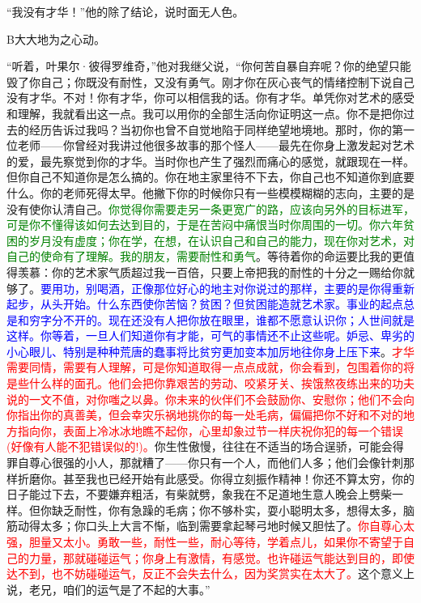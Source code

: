 \documentclass[12pt, UTF8]{ctexbook}
\begin{document}
\par “我没有才华！”他的除了结论，说时面无人色。
\par B大大地为之心动。
\par “听着，叶果尔·彼得罗维奇，”他对我继父说，“你何苦自暴自弃呢？你的绝望只能毁了你自己；你既没有耐性，又没有勇气。刚才你在灰心丧气的情绪控制下说自己没有才华。不对！你有才华，你可以相信我的话。你有才华。单凭你对艺术的感受和理解，我就看出这一点。我可以用你的全部生活向你证明这一点。你不是把你过去的经历告诉过我吗？当初你也曾不自觉地陷于同样绝望地境地。那时，你的第一位老师——你曾经对我讲过他很多故事的那个怪人——最先在你身上激发起对艺术的爱，最先察觉到你的才华。当时你也产生了强烈而痛心的感觉，就跟现在一样。但你自己不知道你是怎么搞的。你在地主家里待不下去，你自己也不知道你到底要什么。你的老师死得太早。他撇下你的时候你只有一些模模糊糊的志向，主要的是没有使你认清自己。\textcolor{green}{你觉得你需要走另一条更宽广的路，应该向另外的目标进军，可是你不懂得该如何去达到目的，于是在苦闷中痛恨当时你周围的一切。你六年贫困的岁月没有虚度；你在学，在想，在认识自己和自己的能力，现在你对艺术，对自己的使命有了理解。我的朋友，需要耐性和勇气}。等待着你的命运要比我的更值得羡慕：你的艺术家气质超过我一百倍，只要上帝把我的耐性的十分之一赐给你就够了。\textcolor{blue}{要用功，别喝酒，正像那位好心的地主对你说过的那样，主要的是你得重新起步，从头开始。什么东西使你苦恼？贫困？但贫困能造就艺术家。事业的起点总是和穷字分不开的。现在还没有人把你放在眼里，谁都不愿意认识你；人世间就是这样。你等着，一旦人们知道你有才能，可气的事情还不止这些呢。妒忌、卑劣的小心眼儿、特别是种种荒唐的蠢事将比贫穷更加变本加厉地往你身上压下来}。\textcolor{red}{才华需要同情，需要有人理解，可是你知道取得一点点成就，你会看到，包围着你的将是些什么样的面孔。他们会把你靠艰苦的劳动、咬紧牙关、挨饿熬夜练出来的功夫说的一文不值，对你嗤之以鼻。你未来的伙伴们不会鼓励你、安慰你；他们不会向你指出你的真善美，但会幸灾乐祸地挑你的每一处毛病，偏偏把你不好和不对的地方指向你，表面上冷冰冰地瞧不起你，心里却象过节一样庆祝你犯的每一个错误(好像有人能不犯错误似的!)。}你生性傲慢，往往在不适当的场合逞骄，可能会得罪自尊心很强的小人，那就糟了——你只有一个人，而他们人多；他们会像针刺那样折磨你。甚至我也已经开始有此感受。你得立刻振作精神！你还不算太穷，你的日子能过下去，不要嫌弃粗活，有柴就劈，象我在不足道地生意人晚会上劈柴一样。但你缺乏耐性，你有急躁的毛病；你不够朴实，耍小聪明太多，想得太多，脑筋动得太多；你口头上大言不惭，临到需要拿起琴弓地时候又胆怯了。\textcolor{red}{你自尊心太强，胆量又太小。勇敢一些，耐性一些，耐心等待，学着点儿，如果你不寄望于自己的力量，那就碰碰运气；你身上有激情，有感觉。也许碰运气能达到目的，即使达不到，也不妨碰碰运气，反正不会失去什么，因为奖赏实在太大了。}这个意义上说，老兄，咱们的运气是了不起的大事。”
\end{document}
